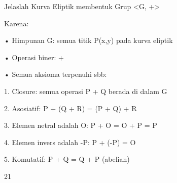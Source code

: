 \documentclass{article}
\begin{document}

Jelaslah Kurva Eliptik membentuk Grup <G, +>

Karena:

• Himpunan G: semua titik P(x,y) pada kurva eliptik

• Operasi biner: +

• Semua aksioma terpenuhi sbb:

 1. Closure: semua operasi P + Q berada di dalam G

 2. Asosiatif:  P + (Q + R) = (P + Q) + R

 3. Elemen netral adalah O:   P + O = O + P = P

 4. Elemen invers adalah -P:  P + (-P) = O

 5. Komutatif: P + Q = Q + P     (abelian)

21
\end{document}
